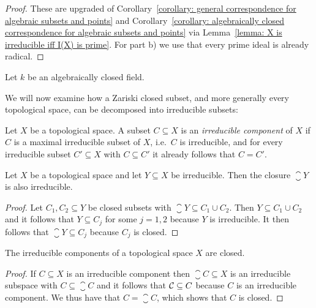 \begin{proof}
  These are upgraded of Corollary~\ref{corollary: general correspondence for algebraic subsets and points} and Corollary~\ref{corollary: algebraically closed correspondence for algebraic subsets and points} via Lemma~\ref{lemma: X is irreducible iff I(X) is prime}.
  For part b) we use that every prime ideal is already radical.
\end{proof}


\begin{corollary}
  Let $k$ be an algebraically closed field.
\end{corollary}


\begin{fluff}
  We will now examine how a Zariski closed subset, and more generally every topological space, can be decomposed into irreducible subsets:
\end{fluff}


\begin{definition}
  Let $X$ be a topological space.
  A subset $C \subseteq X$ is an \emph{irreducible component} of $X$ if $C$ is a maximal irreducible subset of $X$, i.e.\ $C$ is irreducible, and for every irreducible subset $C' \subseteq X$ with $C \subseteq C'$ it already follows that $C = C'$.
\end{definition}


\begin{lemma}
  Let $X$ be a topological space and let $Y \subseteq X$ be irreducible.
  Then the closure $\closure{Y}$ is also irreducible.
\end{lemma}


\begin{proof}
  Let $C_1, C_2 \subseteq Y$ be closed subsets with $\closure{Y} \subseteq C_1 \cup C_2$.
  Then $Y \subseteq C_1 \cup C_2$ and it follows that $Y \subseteq C_j$ for some $j = 1,2$ because $Y$ is irreducible.
  It then follows that $\closure{Y} \subseteq C_j$ because $C_j$ is closed.
\end{proof}


\begin{corollary}
  The irreducible components of a topological space $X$ are closed.
\end{corollary}


\begin{proof}
  If $C \subseteq X$ is an irreducible component then $\closure{C} \subseteq X$ is an irreducible subspace with $C \subseteq \closure{C}$ and it follows that $\mathcal{C} \subseteq C$ because $C$ is an irreducible component.
  We thus have that $C = \closure{C}$, which shows that $C$ is closed.
\end{proof}


